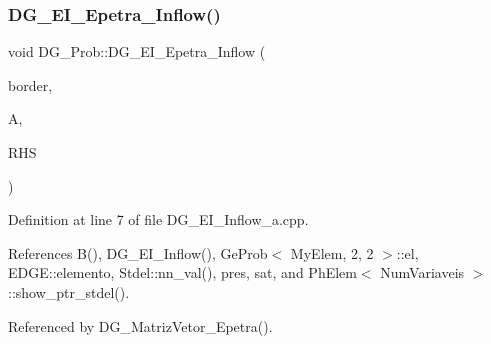 \subsubsection{\texorpdfstring{D\+G\+\_\+\+E\+I\+\_\+\+Epetra\+\_\+\+Inflow()}{DG\_EI\_Epetra\_Inflow()}}
{\footnotesize\ttfamily void D\+G\+\_\+\+Prob\+::\+D\+G\+\_\+\+E\+I\+\_\+\+Epetra\+\_\+\+Inflow (\begin{DoxyParamCaption}\item[{const \hyperlink{structEDGE}{E\+D\+GE}}]{border,  }\item[{Teuchos\+::\+R\+CP$<$ Epetra\+\_\+\+F\+E\+Crs\+Matrix $>$}]{A,  }\item[{Teuchos\+::\+R\+CP$<$ Epetra\+\_\+\+F\+E\+Vector $>$}]{R\+HS }\end{DoxyParamCaption})}



Definition at line 7 of file D\+G\+\_\+\+E\+I\+\_\+\+Inflow\+\_\+a.\+cpp.



References B(), D\+G\+\_\+\+E\+I\+\_\+\+Inflow(), Ge\+Prob$<$ My\+Elem, 2, 2 $>$\+::el, E\+D\+G\+E\+::elemento, Stdel\+::nn\+\_\+val(), pres, sat, and Ph\+Elem$<$ Num\+Variaveis $>$\+::show\+\_\+ptr\+\_\+stdel().



Referenced by D\+G\+\_\+\+Matriz\+Vetor\+\_\+\+Epetra().


